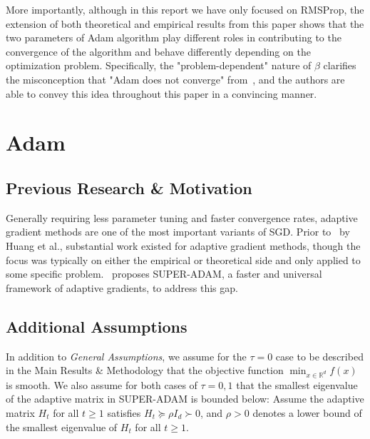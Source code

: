 \documentclass{article}
\begin{document}
More importantly, although in this report we have only focused on RMSProp, the extension of both theoretical and empirical results from this paper shows that the two parameters of Adam algorithm play different roles in contributing to the convergence of the algorithm and behave differently depending on the optimization problem. Specifically, the "problem-dependent" nature of $\beta$ clarifies the misconception that "Adam does not converge" from~\cite{https://doi.org/10.48550/arxiv.1904.09237}, and the authors are able to convey this idea throughout this paper in a convincing manner.
\section{Adam}
\label{section7}
\setcounter{equation}{0}
\subsection{Previous Research \& Motivation}
Generally requiring less parameter tuning and faster convergence rates, adaptive gradient methods are one of the most important variants of SGD. Prior to~\cite{https://doi.org/10.48550/arxiv.2106.08208} by Huang et al., substantial work existed for adaptive gradient methods, though the focus was typically
on either the empirical or theoretical side and only applied to some specific problem.~\cite{https://doi.org/10.48550/arxiv.2106.08208} proposes SUPER-ADAM, a faster and universal framework of adaptive gradients, to address this gap.
\subsection{Additional Assumptions}
In addition to \textit{General Assumptions}, we assume for the $\tau = 0$ case to be described in the Main Results \& Methodology that the objective function $\min_{x \in \mathbb{R}^d} f(x)$ is smooth. We also assume for both cases of $\tau=0,1$ that the smallest eigenvalue of the adaptive matrix
in SUPER-ADAM is bounded below: Assume the adaptive matrix $H_t$ for all $t\geq 1$ satisfies $H_t \succeq \rho I_d\succ 0$, and $\rho > 0$ denotes a lower bound of the smallest eigenvalue of $H_t$ for all $t\geq 1$.
\end{document}

